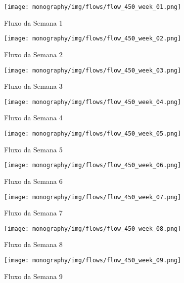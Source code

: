 \label{attachment:flows}

\begin{figure}[htbp]
    \centering
    \texttt{[image: monography/img/flows/flow\_450\_week\_01.png]}
    \label{figure:flow_450_week_01}
    \caption{Fluxo da Semana 1}
\end{figure}

\begin{figure}[htbp]
    \centering
    \texttt{[image: monography/img/flows/flow\_450\_week\_02.png]}
    \label{figure:flow_450_week_02}
    \caption{Fluxo da Semana 2}
\end{figure}

\begin{figure}[htbp]
    \centering
    \texttt{[image: monography/img/flows/flow\_450\_week\_03.png]}
    \label{figure:flow_450_week_03}
    \caption{Fluxo da Semana 3}
\end{figure}

\begin{figure}[htbp]
    \centering
    \texttt{[image: monography/img/flows/flow\_450\_week\_04.png]}
    \label{figure:flow_450_week_04}
    \caption{Fluxo da Semana 4}
\end{figure}

\begin{figure}[htbp]
    \centering
    \texttt{[image: monography/img/flows/flow\_450\_week\_05.png]}
    \label{figure:flow_450_week_05}
    \caption{Fluxo da Semana 5}
\end{figure}

\begin{figure}[htbp]
    \centering
    \texttt{[image: monography/img/flows/flow\_450\_week\_06.png]}
    \label{figure:flow_450_week_06}
    \caption{Fluxo da Semana 6}
\end{figure}


\begin{figure}[htbp]
    \centering
    \texttt{[image: monography/img/flows/flow\_450\_week\_07.png]}
    \label{figure:flow_450_week_07}
    \caption{Fluxo da Semana 7}
\end{figure}


\begin{figure}[htbp]
    \centering
    \texttt{[image: monography/img/flows/flow\_450\_week\_08.png]}
    \label{figure:flow_450_week_08}
    \caption{Fluxo da Semana 8}
\end{figure}


\begin{figure}[htbp]
    \centering
    \texttt{[image: monography/img/flows/flow\_450\_week\_09.png]}
    \label{figure:flow_450_week_09}
    \caption{Fluxo da Semana 9}
\end{figure}


